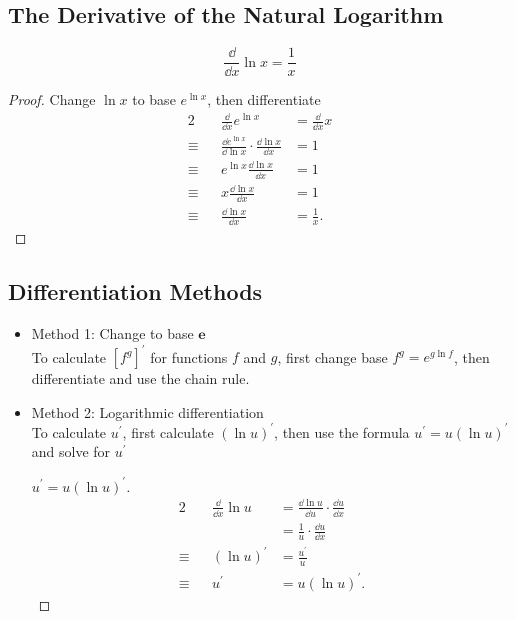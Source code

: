 \subsection{The Derivative of the Natural Logarithm}
\[\frac\dd{\dd x}\ln x=\frac1 x\]
\begin{proof}
  Change $\ln x$ to base $e^{\ln x}$, then differentiate
  \begin{alignat*}{2}
             &&        \frac\dd{\dd x}e^{\ln x} & =\frac\dd{\dd x}x\\
    \equiv{} && \frac{\dd e^{\ln x}}{\dd\ln x}\cdot\frac{\dd\ln x}{\dd x} & =1\\
    \equiv{} && e^{\ln x}\frac{\dd\ln x}{\dd x} & =1\\
    \equiv{} &&         x\frac{\dd\ln x}{\dd x} & =1\\
    \equiv{} &&          \frac{\dd\ln x}{\dd x} & =\frac{1}{x}.
  \end{alignat*}
\end{proof}

\subsection{Differentiation Methods}
\begin{itemize}
\item Method 1: Change to base $\bm{e}$\\
To calculate $[f^g]^\prime$ for functions $f$ and $g$, first change base $f^g=e^{g\ln f}$, then differentiate and use the chain rule.
\item Method 2: Logarithmic differentiation\\
To calculate $u^\prime$, first calculate $(\ln u)^\prime$, then use the formula $u^\prime=u(\ln u)^\prime$ and solve for $u^\prime$
  \begin{proof}[$u^\prime=u(\ln u)^\prime$]
    \begin{alignat*}{2}
      && \frac{\dd }{\dd x}\ln u & =\frac{\dd \ln u}{\dd u}\cdot\frac{\dd u}{\dd x}\\
                              && & =\frac1 u\cdot\frac{\dd u}{\dd x}\\
      \equiv && (\ln u)^\prime & =\frac{u^\prime}{u}\\
      \equiv && u^\prime & =u(\ln u)^\prime .
    \end{alignat*}
  \end{proof}
\end{itemize}
